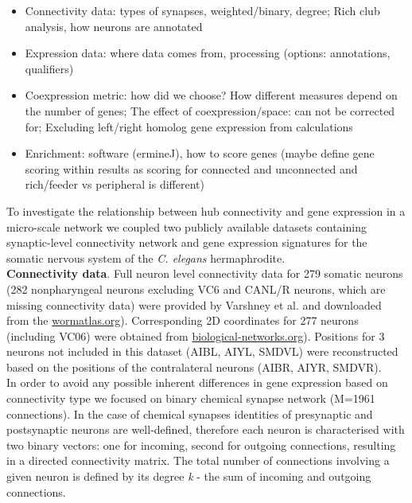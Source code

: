 \documentclass[10pt,letterpaper]{article}
\begin{document}
\begin{itemize}
    \item{Connectivity data: types of synapses, weighted/binary, degree; Rich club analysis, how neurons are annotated}
    \item{Expression data: where data comes from, processing (options: annotations, qualifiers)}
    \item{Coexpression metric: how did we choose? How different measures depend on the number of genes; The effect of coexpression/space: can not be corrected for; Excluding left/right homolog gene expression from calculations}
    \item{Enrichment: software (ermineJ), how to score genes (maybe define gene scoring within results as scoring for connected and unconnected and rich/feeder vs peripheral is different)}
    
\end{itemize}    
To investigate the relationship between hub connectivity and gene expression in a micro-scale network we coupled two publicly available datasets containing synaptic-level connectivity network and gene expression signatures for the somatic nervous system of the \textit{C. elegans} hermaphrodite.\\

\textbf{Connectivity data}. Full neuron level connectivity data for 279 somatic neurons (282 nonpharyngeal neurons excluding VC6 and CANL/R neurons, which are missing connectivity data) were provided by Varshney et al. \cite{Varshney2011} and downloaded from the  \href{http://www.wormatlas.org/neuronalwiring.html#NeuronalconnectivityII}{wormatlas.org}). 
Corresponding 2D coordinates for 277 neurons (including VC06) were obtained from \href{www.biological-networks.org/?page_id=25}{biological-networks.org}). 
Positions for 3 neurons not included in this dataset (AIBL, AIYL, SMDVL) were reconstructed based on the positions of the contralateral neurons (AIBR, AIYR, SMDVR).  \\ 
In order to avoid any possible inherent differences in gene expression based on connectivity type we focused on binary chemical synapse network (M=1961 connections).
In the case of chemical synapses identities of presynaptic and postsynaptic neurons are well-defined, therefore each neuron is characterised with two binary vectors: one for incoming, second for outgoing connections, resulting in a directed connectivity matrix.
The total number of connections involving a given neuron is defined by its degree \textit{k} - the sum of incoming and outgoing connections.
\end{document}
